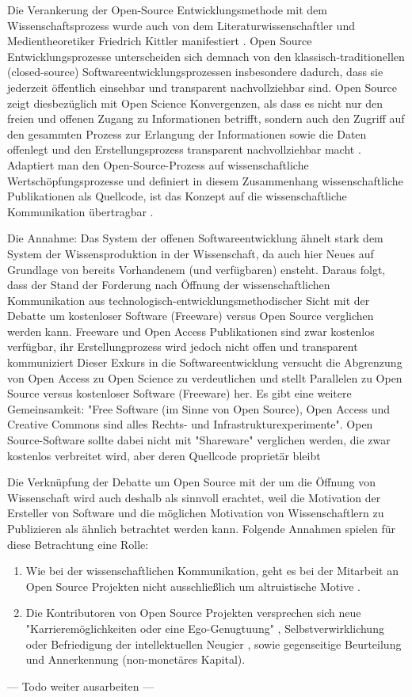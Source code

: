 Die Verankerung der Open-Source Entwicklungsmethode mit dem Wissenschaftsprozess wurde auch von dem Literaturwissenschaftler und Medientheoretiker Friedrich Kittler manifestiert \cite{suchen}. Open Source Entwicklungsprozesse unterscheiden sich demnach von den klassisch-traditionellen (closed-source) Softwareentwicklungsprozessen insbesondere dadurch, dass sie jederzeit öffentlich einsehbar und transparent nachvollziehbar sind. Open Source zeigt diesbezüglich mit Open Science Konvergenzen, als dass es nicht nur den freien und offenen Zugang zu Informationen betrifft, sondern auch den Zugriff auf den gesammten Prozess zur Erlangung der Informationen sowie die Daten offenlegt und den Erstellungsprozess transparent nachvollziehbar macht \cite{kelty_2004}. Adaptiert man den Open-Source-Prozess auf wissenschaftliche Wertschöpfungsprozesse und definiert in diesem Zusammenhang wissenschaftliche Publikationen als Quellcode, ist das Konzept auf die wissenschaftliche Kommunikation übertragbar \cite{Singh_2008} \cite{Bradley_2008} \cite{Bradley_2007} \cite{Willinsky_2005}.

Die Annahme: Das System der offenen Softwareentwicklung ähnelt stark dem System der Wissensproduktion in der Wissenschaft, da auch hier Neues auf Grundlage von bereits Vorhandenem (und verfügbaren) ensteht. Daraus folgt, dass der Stand der Forderung nach Öffnung der wissenschaftlichen Kommunikation aus technologisch-entwicklungsmethodischer Sicht mit der Debatte um kostenloser Software (Freeware) versus Open Source verglichen werden kann. Freeware und Open Access Publikationen sind zwar kostenlos verfügbar, ihr Erstellungprozess wird jedoch nicht offen und transparent kommuniziert Dieser Exkurs in die Softwareentwicklung versucht die Abgrenzung von Open Access zu Open Science zu verdeutlichen und stellt Parallelen zu Open Source versus kostenloser Software (Freeware) her. Es gibt eine weitere Gemeinsamkeit: "Free Software (im Sinne von Open Source), Open Access und Creative Commons sind alles Rechts- und Infrastrukturexperimente"\cite{kelty_2004}. Open Source-Software sollte dabei nicht mit "Shareware" verglichen werden, die zwar kostenlos verbreitet wird, aber deren Quellcode proprietär bleibt \cite{Lerner_2001}

Die Verknüpfung der Debatte um Open Source mit der um die Öffnung von Wissenschaft wird auch deshalb als sinnvoll erachtet, weil die Motivation der Ersteller von Software und die möglichen Motivation von Wissenschaftlern zu Publizieren als ähnlich betrachtet werden kann. Folgende Annahmen spielen für diese Betrachtung eine Rolle:
\begin{enumerate}
\item Wie bei der wissenschaftlichen Kommunikation, geht es bei der Mitarbeit an Open Source Projekten nicht ausschließlich um altruistische Motive \cite{Lerner_2001}.
\item Die Kontributoren von Open Source Projekten versprechen sich neue "Karrieremöglichkeiten oder eine Ego-Genugtuung" \cite{Lerner_2001}, Selbstverwirklichung oder Befriedigung der intellektuellen Neugier \cite{Willinsky_2005}, sowie gegenseitige Beurteilung und Annerkennung (non-monetäres Kapital).
\end{enumerate}
--- Todo weiter ausarbeiten ---

